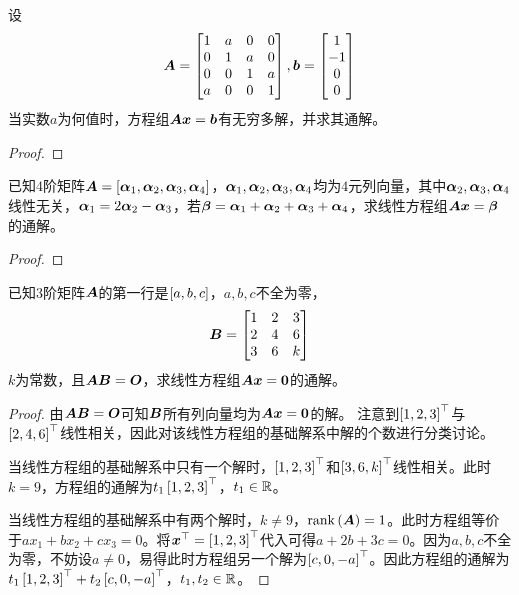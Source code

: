 \begin{problem}\label{problem-2.12}
设
\begin{equation*}
    \boldsymbol{A}=
    \begin{bmatrix}
        1 & a & 0 & 0 \\
        0 & 1 & a & 0 \\
        0 & 0 & 1 & a \\
        a & 0 & 0 & 1
    \end{bmatrix},
    \boldsymbol{b}=
    \begin{bmatrix}
        1 \\-1\\0\\0
    \end{bmatrix}
\end{equation*}
当实数\(a\)为何值时，方程组\(\boldsymbol{A}\boldsymbol{x}=\boldsymbol{b}\)有无穷多解，并求其通解。
\end{problem}
\begin{proof}
\end{proof}

\begin{problem}\label{problem-2.13}
已知\(4\)阶矩阵\(\boldsymbol{A}=\left[ \boldsymbol{\alpha}_1,\boldsymbol{\alpha}_2,\boldsymbol{\alpha}_3,\boldsymbol{\alpha}_4 \right]\)，\(\boldsymbol{\alpha}_1,\boldsymbol{\alpha}_2,\boldsymbol{\alpha}_3,\boldsymbol{\alpha}_4\)均为\(4\)元列向量，其中\(\boldsymbol{\alpha}_2,\boldsymbol{\alpha}_3,\boldsymbol{\alpha}_4\)线性无关，\(\boldsymbol{\alpha}_1=2\boldsymbol{\alpha}_2-\boldsymbol{\alpha}_3\)，若\(\boldsymbol{\beta}=\boldsymbol{\alpha}_1+\boldsymbol{\alpha}_2+\boldsymbol{\alpha}_3+\boldsymbol{\alpha}_4\)，求线性方程组\(\boldsymbol{A}\boldsymbol{x}=\boldsymbol{\beta}\)的通解。
\end{problem}
\begin{proof}
\end{proof}

\begin{problem}\label{problem-2.14}
已知\(3\)阶矩阵\(\boldsymbol{A}\)的第一行是\(\left[ a,b,c \right]\)，\(a,b,c\)不全为零，
\begin{equation*}
    \boldsymbol{B}=
    \begin{bmatrix}
        1 & 2 & 3 \\
        2 & 4 & 6 \\
        3 & 6 & k
    \end{bmatrix}
\end{equation*}
\(k\)为常数，且\(\boldsymbol{A}\boldsymbol{B}=\boldsymbol{O}\)，求线性方程组\(\boldsymbol{A}\boldsymbol{x}=\boldsymbol{0}\)的通解。
\end{problem}
\begin{proof}
    由\(\boldsymbol{A}\boldsymbol{B}=\boldsymbol{O}\)可知\(\boldsymbol{B}\)所有列向量均为\(\boldsymbol{A}\boldsymbol{x}=\boldsymbol{0}\)的解。
    注意到\(\left[ 1,2,3 \right]^\top\)与\(\left[ 2,4,6 \right]^\top\)线性相关，因此对该线性方程组的基础解系中解的个数进行分类讨论。

    当线性方程组的基础解系中只有一个解时，\(\left[ 1,2,3 \right]^\top\)和\(\left[ 3,6,k \right]^\top\)线性相关。此时\(k=9\)，方程组的通解为\(t_1\left[ 1,2,3 \right]^\top\)，\(t_1\in\boldsymbol{\mathbb{R}}\)。

    当线性方程组的基础解系中有两个解时，\(k\neq9\)，\(\mathrm{rank}\left( \boldsymbol{A} \right)=1\)。此时方程组等价于\(ax_1+bx_2+cx_3=0\)。将\(\boldsymbol{x}^\top=\left[ 1,2,3 \right]^\top\)代入可得\(a+2b+3c=0\)。因为\(a,b,c\)不全为零，不妨设\(a\neq0\)，易得此时方程组另一个解为\(\left[ c,0,-a \right]^\top\)。因此方程组的通解为\(t_1\left[ 1,2,3 \right]^\top+t_2\left[ c,0,-a \right]^\top\)，\(t_1,t_2\in\boldsymbol{\mathbb{R}}\)。
\end{proof}


